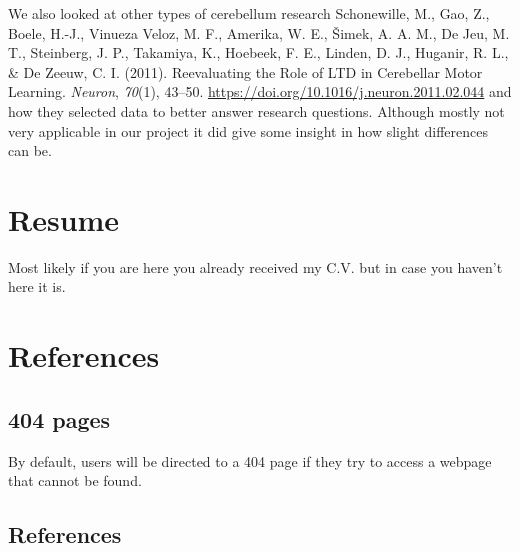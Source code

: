 \documentclass[11pt,a4paper,]{awesome-cv}
\begin{document}
We also looked at other types of cerebellum research Schonewille, M.,
Gao, Z., Boele, H.-J., Vinueza Veloz, M. F., Amerika, W. E., Šimek, A.
A. M., De Jeu, M. T., Steinberg, J. P., Takamiya, K., Hoebeek, F. E.,
Linden, D. J., Huganir, R. L., \& De Zeeuw, C. I. (2011). Reevaluating
the {Role} of {LTD} in {Cerebellar Motor Learning}. \emph{Neuron},
\emph{70}(1), 43--50. \url{https://doi.org/10.1016/j.neuron.2011.02.044}
and how they selected data to better answer research questions. Although
mostly not very applicable in our project it did give some insight in
how slight differences can be.

\hypertarget{resume}{%
\chapter{Resume}\label{resume}}

Most likely if you are here you already received my C.V. but in case you
haven't here it is.

\hypertarget{references}{%
\chapter{References}\label{references}}

\hypertarget{pages}{%
\section{404 pages}\label{pages}}

By default, users will be directed to a 404 page if they try to access a
webpage that cannot be found.

\hypertarget{references-1}{%
\section{References}\label{references-1}}
\end{document}
